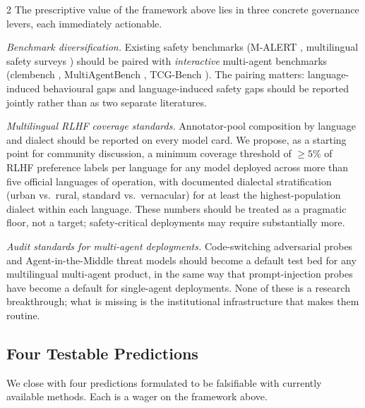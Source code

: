 \documentclass[openacc]{rsproca_new}
\begin{document}
\begin{multicols}{2}
The prescriptive value of the framework above lies in three concrete governance levers, each immediately actionable.

\emph{Benchmark diversification.} Existing safety benchmarks (M-ALERT \cite{m-alert2025}, multilingual safety surveys \cite{yong2025multilingualsafety, wang2024evaluating}) should be paired with \emph{interactive} multi-agent benchmarks (clembench \cite{schlangen2025clembench}, MultiAgentBench \cite{nie2025multiagentbench}, TCG-Bench \cite{wang2025tcgbench}). The pairing matters: language-induced behavioural gaps and language-induced safety gaps should be reported jointly rather than as two separate literatures.

\emph{Multilingual RLHF coverage standards.} Annotator-pool composition by language and dialect should be reported on every model card. We propose, as a starting point for community discussion, a minimum coverage threshold of $\geq 5\%$ of RLHF preference labels per language for any model deployed across more than five official languages of operation, with documented dialectal stratification (urban vs.\ rural, standard vs.\ vernacular) for at least the highest-population dialect within each language. These numbers should be treated as a pragmatic floor, not a target; safety-critical deployments may require substantially more.

\emph{Audit standards for multi-agent deployments.} Code-switching adversarial probes \cite{yoo2025csrt} and Agent-in-the-Middle threat models \cite{he2025agentmiddle} should become a default test bed for any multilingual multi-agent product, in the same way that prompt-injection probes have become a default for single-agent deployments. None of these is a research breakthrough; what is missing is the institutional infrastructure that makes them routine.

\subsection{Four Testable Predictions}
\label{sec:predictions}

We close with four predictions formulated to be falsifiable with currently available methods. Each is a wager on the framework above.


\end{multicols}
\end{document}
